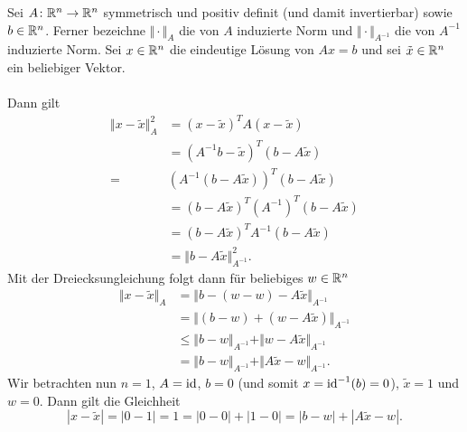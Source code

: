 
Sei $A\colon \mathbb{R}^n\to\mathbb{R}^n$ symmetrisch und positiv definit (und damit invertierbar) sowie $b\in\mathbb{R}^n$.
Ferner bezeichne $\Vert\cdot\Vert_A$ die von $A$ induzierte Norm und
$\Vert\cdot\Vert_{A^{-1}}$ die von $A^{-1}$ induzierte Norm. Sei $x\in\mathbb{R}^n$
die eindeutige Lösung von $Ax=b$ und sei $\tilde x\in\mathbb{R}^n$ ein beliebiger Vektor.
\\ \\
Dann gilt
\begin{align*}
 \Vert x-\tilde x \Vert_A^2 &=(x-\tilde x)^TA(x-\tilde x)\\&=(A^{-1}b-\tilde x)^T(b-A\tilde x)\\
 =&(A^{-1}(b-A\tilde x))^T(b-A\tilde x)\\&=(b-A\tilde x)^T(A^{-1})^T(b-A\tilde x)\\&=(b-A\tilde x)^TA^{-1}(b-A\tilde x)\\&=\Vert b-A\tilde x\Vert_{A^{-1}}^2.
\end{align*}
Mit der Dreiecksungleichung folgt dann für beliebiges $w\in\mathbb{R}^n$
\begin{align*}
\Vert x-\tilde x \Vert_A&=\Vert b-(w-w)-A\tilde x\Vert_{A^{-1}}\\
&=\Vert (b-w)+(w-A\tilde x)\Vert_{A^{-1}}\\
&\leq\Vert b-w\Vert_{A^{-1}}+\Vert w-A\tilde x\Vert_{A^{-1}}\\
&=\Vert b-w\Vert_{A^{-1}}+\Vert A\tilde x-w\Vert_{A^{-1}}.
\end{align*}
Wir betrachten nun $n=1$, $A=\operatorname{id}$, $b=0$ (und somit $x=\operatorname{id}^{-1}(b)=0$), $\tilde x=1$ und $w=0$. Dann gilt die Gleichheit
\begin{displaymath}
 |x-\tilde x|=|0-1|=1=|0-0|+|1-0|=|b-w|+|A\tilde x-w|.
\end{displaymath}
